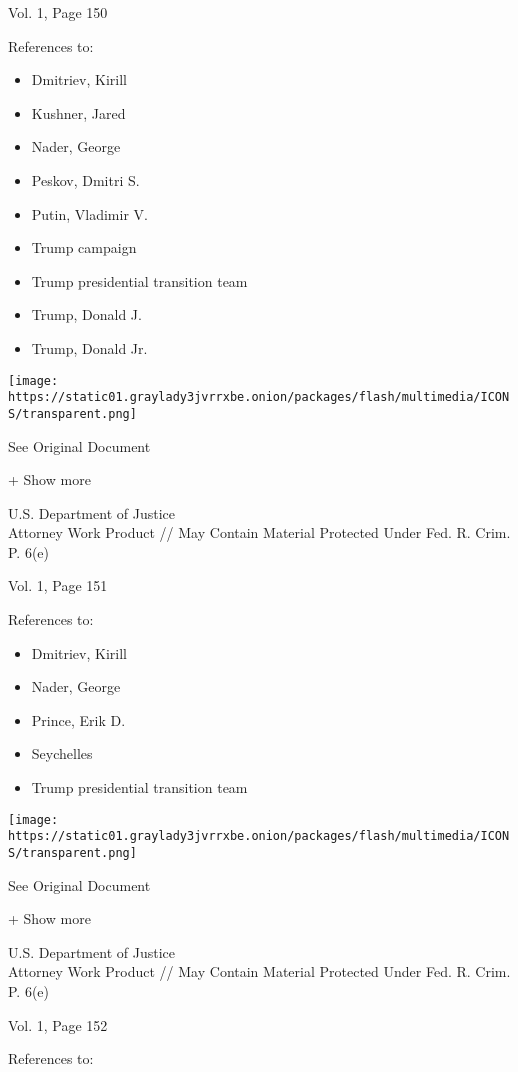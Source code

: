 Vol. 1, Page 150

References to:

\begin{itemize}
\tightlist
\item
  Dmitriev, Kirill
\item
  Kushner, Jared
\item
  Nader, George
\item
  Peskov, Dmitri S.
\item
  Putin, Vladimir V.
\item
  Trump campaign
\item
  Trump presidential transition team
\item
  Trump, Donald J.
\item
  Trump, Donald Jr.
\end{itemize}

\protect\hyperlink{}{}

\texttt{[image: https://static01.graylady3jvrrxbe.onion/packages/flash/multimedia/ICONS/transparent.png]}

See Original Document

+ Show more

U.S. Department of Justice\\
Attorney Work Product // May Contain Material Protected Under Fed. R.
Crim. P. 6(e)

Vol. 1, Page 151

References to:

\begin{itemize}
\tightlist
\item
  Dmitriev, Kirill
\item
  Nader, George
\item
  Prince, Erik D.
\item
  Seychelles
\item
  Trump presidential transition team
\end{itemize}

\protect\hyperlink{}{}

\texttt{[image: https://static01.graylady3jvrrxbe.onion/packages/flash/multimedia/ICONS/transparent.png]}

See Original Document

+ Show more

U.S. Department of Justice\\
Attorney Work Product // May Contain Material Protected Under Fed. R.
Crim. P. 6(e)

Vol. 1, Page 152

References to:

